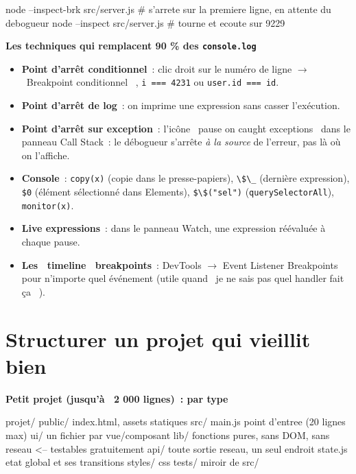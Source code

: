 \documentclass[12pt,a4paper,twoside,openright]{book}
\newcommand{\etape}[1]{\par\medskip\noindent\textbf{\large #1}\par\smallskip}
\begin{document}
\begin{terminal}
node --inspect-brk src/server.js        # s'arrete sur la premiere ligne, en attente du debogueur
node --inspect src/server.js            # tourne et ecoute sur 9229
\end{terminal}

\etape{Les techniques qui remplacent 90 \% des \texttt{console.log}}
\begin{itemize}
  \item \textbf{Point d'arr\^et conditionnel}~: clic droit sur le num\'ero de ligne $\rightarrow$ \og ~Breakpoint
        conditionnel~ \fg{}, \verb|i === 4231| ou \verb|user.id === id|.
  \item \textbf{Point d'arr\^et de log}~: on imprime une expression sans casser l'ex\'ecution.
  \item \textbf{Point d'arr\^et sur exception}~: l'ic\^one \og ~pause on caught exceptions~ \fg{} dans le panneau
        Call Stack~: le d\'ebogueur s'arr\^ete \emph{\`a la source} de l'erreur, pas l\`a o\`u on l'affiche.
  \item \textbf{Console}~: \verb|copy(x)| (copie dans le presse-papiers), \verb|\$\_| (derni\`ere
        expression), \verb|$0| (\'el\'ement s\'electionn\'e dans Elements), \verb|$\$("sel")| (\texttt{querySelectorAll}), \verb|monitor(x)|.
  \item \textbf{Live expressions}~: dans le panneau Watch, une expression r\'e\'evalu\'ee \`a chaque pause.
  \item \textbf{Les \og ~timeline~ \fg{} breakpoints}~: DevTools $\rightarrow$ Event Listener Breakpoints pour
        n'importe quel \'ev\'enement (utile quand \og ~je ne sais pas quel handler fait \c{c}a~ \fg{}).
\end{itemize}

\section{Structurer un projet qui vieillit bien}

\etape{Petit projet (jusqu'\`a ~2 000 lignes)~: par type}
\begin{codeplain}
projet/
  public/          index.html, assets statiques
  src/
    main.js        point d'entree (20 lignes max)
    ui/            un fichier par vue/composant
    lib/           fonctions pures, sans DOM, sans reseau  <-- testables gratuitement
    api/           toute sortie reseau, un seul endroit
    state.js       etat global et ses transitions
    styles/        css
  tests/           miroir de src/
\end{codeplain}
\end{document}
